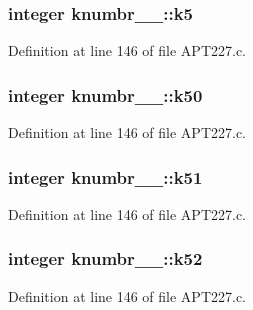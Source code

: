 \subsubsection[{\texorpdfstring{k5}{k5}}]{\setlength{\rightskip}{0pt plus 5cm}integer knumbr\+\_\+\_\+\+::k5}\hypertarget{structknumbr__1___aa9a4e83e182e134ce043f234916062f3}{}\label{structknumbr__1___aa9a4e83e182e134ce043f234916062f3}


Definition at line 146 of file A\+P\+T227.\+c.

\subsubsection[{\texorpdfstring{k50}{k50}}]{\setlength{\rightskip}{0pt plus 5cm}integer knumbr\+\_\+\_\+\+::k50}\hypertarget{structknumbr__1___afd6c5372ee7c79e81f30511b30efd6b6}{}\label{structknumbr__1___afd6c5372ee7c79e81f30511b30efd6b6}


Definition at line 146 of file A\+P\+T227.\+c.

\subsubsection[{\texorpdfstring{k51}{k51}}]{\setlength{\rightskip}{0pt plus 5cm}integer knumbr\+\_\+\_\+\+::k51}\hypertarget{structknumbr__1___a9711d92a5440aa900ef656b89e9e9907}{}\label{structknumbr__1___a9711d92a5440aa900ef656b89e9e9907}


Definition at line 146 of file A\+P\+T227.\+c.

\subsubsection[{\texorpdfstring{k52}{k52}}]{\setlength{\rightskip}{0pt plus 5cm}integer knumbr\+\_\+\_\+\+::k52}\hypertarget{structknumbr__1___aabfa189bd5559d1193c7e37e6350bb7d}{}\label{structknumbr__1___aabfa189bd5559d1193c7e37e6350bb7d}


Definition at line 146 of file A\+P\+T227.\+c.

